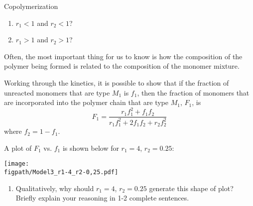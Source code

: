 \begin{activity}{Copolymerization}
\begin{ctqs}
\begin{enumerate}
				\begin{solution}[0.25in]
				\end{solution}
			
			\item $r_1 < 1$ and $r_2 < 1$?
			
				\begin{solution}[0.25in]
				\end{solution}
			
			\item $r_1 > 1$ and $r_2 > 1$?
			
				\begin{solution}[0.25in]
				\end{solution}
		\end{enumerate}

\end{ctqs}

\begin{model}
	\label{\labelbase:mdl:feedratios}
	
	Often, the most important thing for us to know is how the composition of the polymer being formed is related to the composition of the monomer mixture.
	
	Working through the kinetics, it is possible to show that if the fraction of unreacted monomers that are type $M_1$ is $f_1$, then the fraction of monomers that are incorporated into the polymer chain that are type $M_1$, $F_1$, is
	\begin{equation*}
		F_1 = \frac{r_1f_1^2 + f_1f_2}{r_1f_1^2+2f_1f_2 + r_2f_2^2}
	\end{equation*}
	where $f_2 = 1-f_1$.

\end{model}

\begin{ctqs}
	\question A plot of $F_1$ vs. $f_1$ is shown below for $r_1 = 4$, $r_2=0.25$: \label{\labelbase:ctq:feedratplot}
	
		\centerline{\texttt{[image: \\figpath/Model3\_r1-4\_r2-0,25.pdf]}}
	
		\begin{enumerate}
			\item Qualitatively, why should $r_1 = 4$, $r_2=0.25$ generate this shape of plot?  Briefly explain your reasoning in 1-2 complete sentences.
				
				\begin{solution}[1.5in]
				\end{solution}
			

\end{enumerate}
\end{ctqs}
\end{activity}
